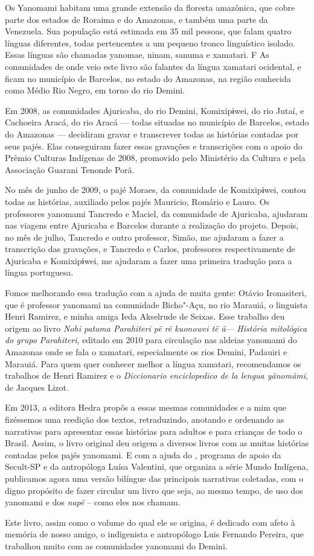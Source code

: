  
Os Yanomami habitam uma grande extensão da floresta amazônica, que cobre
parte dos estados de Roraima e do Amazonas, e também uma parte da
Venezuela. Sua população está estimada em 35 mil pessoas, que falam
quatro línguas diferentes, todas pertencentes a um pequeno tronco
linguístico isolado. Essas línguas são chamadas yanomae, ninam, sanuma e
xamatari.
F
As comunidades de onde veio este livro são falantes da língua xamatari
ocidental, e ficam no município de Barcelos, no estado do Amazonas, na
região conhecida como Médio Rio Negro, em torno do rio Demini. 

Em 2008, as comunidades Ajuricaba, do rio Demini, Komixipɨwei, do rio
Jutaí, e Cachoeira Aracá, do rio Aracá --- todas situadas no município
de Barcelos, estado do Amazonas --- decidiram gravar e transcrever todas
as histórias contadas por seus pajés. Elas conseguiram fazer essas
gravações e transcrições com o apoio do Prêmio Culturas Indígenas de
2008, promovido pelo Ministério da Cultura e pela Associação Guarani
Tenonde Porã.

No mês de junho de 2009, o pajé Moraes, da comunidade de Komixipɨwei,
contou todas as histórias, auxiliado pelos pajés Mauricio, Romário e
Lauro. Os professores yanomami Tancredo e Maciel, da comunidade de
Ajuricaba, ajudaram nas viagens entre Ajuricaba e Barcelos durante a
realização do projeto. Depois, no mês de julho, Tancredo e outro
professor, Simão, me ajudaram a fazer a transcrição das gravações, e
Tancredo e Carlos, professores respectivamente de Ajuricaba e
Komixipɨwei, me ajudaram a fazer uma primeira tradução para a língua
portuguesa.  

Fomos melhorando essa tradução com a ajuda de muita gente: Otávio
Ironasiteri, que é professor yanomami na comunidade Bicho"-Açu, no rio
Marauiá, o linguista Henri Ramirez, e minha amiga Ieda Akselrude de
Seixas. Esse trabalho deu origem ao livro \emph{Nohi patama Parahiteri
pë rë kuonowei të ã}--- \emph{História mitológica do grupo Parahiteri},
editado em 2010 para circulação nas aldeias yanomami do Amazonas onde se
fala o xamatari, especialmente os rios Demini, Padauiri e Marauiá. Para quem quer conhecer melhor a língua xamatari, recomendamos os trabalhos de Henri Ramirez e o \emph{Diccionario enciclopedico de la lengua yãnomãmi}, de Jacques Lizot.  
 

Em 2013, a editora Hedra propôs a essas mesmas comunidades e a mim que
fizéssemos uma reedição dos textos, retraduzindo, anotando e ordenando as
narrativas para apresentar essas histórias para adultos e para crianças de todo
o Brasil. Assim, o livro original deu origem a diversos livros com as muitas
histórias contadas pelos pajés yanomami.  E com a ajuda do ,
programa de apoio da Secult-SP e da antropóloga Luísa Valentini, que organiza a
série Mundo Indígena, publicamos agora uma versão bilíngue das principais
narrativas coletadas, com o digno propósito de fazer circular um livro que
seja, ao mesmo tempo, de uso dos yanomami e dos \textit{napë} – como eles nos chamam. 

Este livro, assim como o volume do qual ele se origina, é dedicado com afeto à memória de nosso amigo, o indigenista e antropólogo Luis Fernando Pereira, que trabalhou muito com as comunidades yanomami do Demini. 